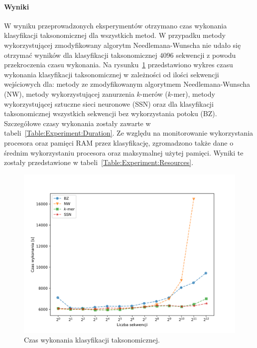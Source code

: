             \paragraph{Wyniki}
                W wyniku przeprowadzonych eksperymentów otrzymano czas wykonania klasyfikacji taksonomicznej dla wszystkich metod. W przypadku metody wykorzystującej zmodyfikowany algorytm Needlemana-Wunscha nie udało się otrzymać wyników dla klasyfikacji taksonomicznej $4096$ sekwencji z powodu przekroczenia czasu wykonania. Na rysunku~\ref{Picture:Experiment:Duration} przedstawiono wykres czasu wykonania klasyfikacji taksonomicznej w zależności od ilości sekwencji wejściowych dla: metody ze zmodyfikowanym algorytmem Needlemana-Wunscha (NW), metody wykorzystującej zanurzenia $k$-merów ($k$-mer), metody wykorzystującej sztuczne sieci neuronowe (SSN) oraz dla klasyfikacji taksonomicznej wszystkich sekwencji bez wykorzystania potoku (BZ). Szczegółowe czasy wykonania zostały zawarte w tabeli~\ref{Table:Experiment:Duration}. Ze względu na monitorowanie wykorzystania procesora oraz pamięci RAM przez klasyfikację, zgromadzono także dane o średnim wykorzystaniu procesora oraz maksymalnej użytej pamięci. Wyniki te zostały przedstawione w tabeli~\ref{Table:Experiment:Resources}.

                \begin{figure}[!htb]
                    \begin{center}
                        \includegraphics[width=\textwidth]{tex/pictures/exp/experiment_duration.png}
                    \end{center}
                    \caption{
                        Czas wykonania klasyfikacji taksonomicznej.
                    }\label{Picture:Experiment:Duration}
                \end{figure}

